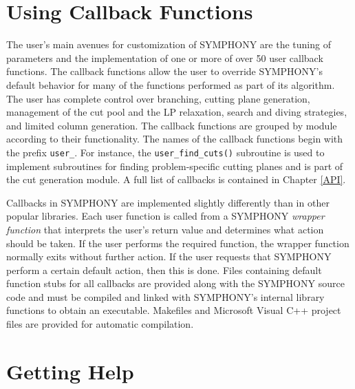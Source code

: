 \section{Using Callback Functions}\label{callback}

The user's main avenues for customization of SYMPHONY are the tuning of
parameters and the implementation of one or more of over 50 user callback
functions. The callback functions allow the user to override SYMPHONY's
default behavior for many of the functions performed as part of its algorithm.
The user has complete control over branching, cutting plane generation,
management of the cut pool and the LP relaxation, search and diving
strategies, and limited column generation. The callback functions are grouped
by module according to their functionality. The names of the callback
functions begin with the prefix \texttt{user\_}. For instance, the
\texttt{user\_find\_cuts()} subroutine is used to implement subroutines for
finding problem-specific cutting planes and is part of the cut generation
module. A full list of callbacks is contained in Chapter \ref{API}.

Callbacks in SYMPHONY are implemented slightly differently than in other
popular libraries. Each user function is called from a SYMPHONY \emph{wrapper
function} that interprets the user's return value and determines what action
should be taken. If the user performs the required function, the wrapper
function normally exits without further action. If the user requests that
SYMPHONY perform a certain default action, then this is done. Files containing
default function stubs for all callbacks are provided along with the SYMPHONY
source code and must be compiled and linked with SYMPHONY's internal library
functions to obtain an executable. Makefiles and Microsoft Visual C++ project
files are provided for automatic compilation.

\section{Getting Help}